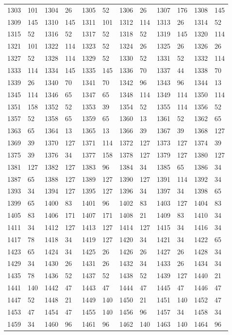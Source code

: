 \begin{longtable}{llllllllllll}
1303 & 101&1304 &26&1305& 52&1306 &26&1307 &176&1308& 145\\
1309 & 145&1310 &145&1311& 101&1312 &114&1313 &26&1314& 52\\
1315 & 52&1316 &52&1317& 52&1318 &52&1319 &145&1320& 114\\
1321 & 101&1322 &114&1323& 52&1324 &26&1325 &26&1326& 26\\
1327 & 52&1328 &114&1329& 52&1330 &52&1331 &52&1332& 114\\
1333 & 114&1334 &145&1335& 145&1336 &70&1337 &44&1338& 70\\
1339 & 26&1340 &70&1341& 70&1342 &96&1343 &96&1344& 13\\
1345 & 114&1346 &65&1347& 65&1348 &114&1349 &114&1350& 114\\
1351 & 158&1352 &52&1353& 39&1354 &52&1355 &114&1356& 52\\
1357 & 52&1358 &65&1359& 65&1360 &13&1361 &52&1362& 65\\
1363 & 65&1364 &13&1365& 13&1366 &39&1367 &39&1368& 127\\
1369 & 39&1370 &127&1371& 114&1372 &127&1373 &127&1374& 39\\
1375 & 39&1376 &34&1377& 158&1378 &127&1379 &127&1380& 127\\
1381 & 127&1382 &127&1383& 96&1384 &34&1385 &65&1386& 34\\
1387 & 65&1388 &127&1389& 127&1390 &127&1391 &114&1392& 34\\
1393 & 34&1394 &127&1395& 127&1396 &34&1397 &34&1398& 65\\
1399 & 65&1400 &83&1401& 96&1402 &83&1403 &127&1404& 83\\
1405 & 83&1406 &171&1407& 171&1408 &21&1409 &83&1410& 34\\
1411 & 34&1412 &127&1413& 127&1414 &127&1415 &34&1416& 34\\
1417 & 78&1418 &34&1419& 127&1420 &34&1421 &34&1422& 65\\
1423 & 65&1424 &34&1425& 26&1426 &26&1427 &26&1428& 34\\
1429 & 34&1430 &26&1431& 26&1432 &34&1433 &26&1434& 34\\
1435 & 78&1436 &52&1437& 52&1438 &52&1439 &127&1440& 21\\
1441 & 140&1442 &47&1443& 47&1444 &47&1445 &47&1446& 47\\
1447 & 52&1448 &21&1449& 140&1450 &21&1451 &140&1452& 47\\
1453 & 47&1454 &47&1455& 140&1456 &96&1457 &34&1458& 34\\
1459 & 34&1460 &96&1461& 96&1462 &140&1463 &140&1464& 96\\

\end{longtable}
